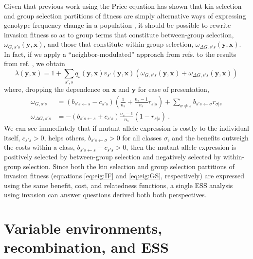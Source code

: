 \documentclass[11pt]{article}
\renewcommand{\vec}[1]{\symbf{#1}}
\newcommand{\eig}{\lambda}
\begin{document}
Given that previous work using the Price equation has shown that kin selection and group selection partitions of fitness are simply alternative ways of expressing genotype frequency change in a population \cite{Queller:1992,Bijma:Wade:2008,Gardner:West:2007,Marshall:2011,Akcay:VanCleve:2012}, it should be possible to rewrite invasion fitness so as to group terms that constitute between-group selection, $\omega_{G,s's}(\vec{y}, \vec{x})$, and those that constitute within-group selection, $\omega_{\Delta G,s's}(\vec{y}, \vec{x})$. In fact, if we apply a ``neighbor-modulated'' approach from refs. \cite{Queller:1992,Akcay:VanCleve:2012} to the results from ref. \cite{Lehmann:Rousset:2020}, we obtain
\begin{equation}
  \label{eq:eig:GS}
  \eig(\vec{y}, \vec{x}) = 1 + \sum_{s',s} q_{s}(\vec{y}, \vec{x}) v_{s'}(\vec{y}, \vec{x})
  \left( \omega_{G,s's}(\vec{y}, \vec{x}) + \omega_{\Delta G,s's}(\vec{y}, \vec{x}) \right)
\end{equation}
where, dropping the dependence on $\vec{x}$ and $\vec{y}$ for ease of presentation,
\begin{equation}
  \label{eq:wg:wdeltag}
  \begin{split}
    \omega_{G,s's} & = \left(b_{s's \leftarrow s} - c_{s's} \right) \left(\frac{1}{n_{s}} + \frac{n_{s}-1}{n_{s}} r_{s|s} \right) + \sum_{\sigma \ne s} b_{s's \leftarrow \sigma} r_{\sigma|s} \\
    \omega_{\Delta G,s's} & = - \left(b_{s's \leftarrow s} + c_{s's}\right) \frac{n_{s}-1}{n_{s}} \left( 1 - r_{s|s} \right) \: .
  \end{split}
\end{equation}
We can see immediately that if mutant allele expression is costly to the individual itself, $c_{s's}>0$, helps others, $b_{s's \leftarrow \sigma}>0$ for all classes $\sigma$, and the benefits outweigh the costs within a class, $b_{s's \leftarrow s} - c_{s's}>0$, then the mutant allele expression is positively selected by between-group selection and negatively selected by within-group selection. Since both the kin selection and group selection partitions of invasion fitness (equations \eqref{eq:eig:IF} and \eqref{eq:eig:GS}, respectively) are expressed using the same benefit, cost, and relatedness functions, a single ESS analysis using invasion can answer questions derived both both perspectives.

\section{Variable environments, recombination, and ESS}
\end{document}
